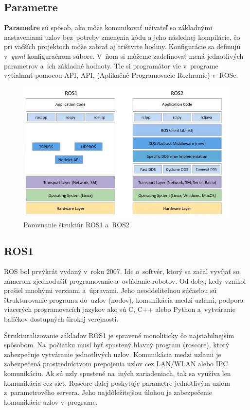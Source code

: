 \subsection{Parametre}
\label{sec:parametre}

\textbf{Parametre} sú spôsob, ako môže komunikovať užívateľ so základnými nastaveniami uzlov bez~potreby zmenenia kódu a jeho
následnej kompilácie, čo pri väčších projektoch môže zabrať aj trištvrte hodiny. Konfigurácie sa definujú v~\textit{yaml} konfiguračnom
súbore. V~ňom si môžeme zadefinovať mená jednotlivých parametrov a~ich základné hodnoty. Tie si programátor vie v~programe
vytiahnuť pomocou API, \acrlong{API}, (Aplikačné Programovacie Rozhranie) v~ROSe.

\begin{figure}[!htbp]
	\centering
	\includegraphics[width=15cm]{img/strukturaRos1Ros2.png}
	\caption{Porovnanie štruktúr ROS1 a~ROS2~\cite{comparison}}
	\label{fig:struktury}
\end{figure}

\subsection{ROS1}

ROS bol prvýkrát vydaný v~roku 2007. Ide o~softvér, ktorý sa začal vyvíjať so zámerom zjednodušiť programovanie a~ovládanie robotov.
Od doby, kedy vznikol prešiel mnohými verziami a~úpravami. Jeho neoddeliteľnou súčasťou sú štrukturovanie programu do~uzlov (nodov),
komunikácia medzi uzlami, podpora viacerých programovacích jazykov ako sú C, C++ alebo Python a~vytváranie balíčkov dostupných širokej
verejnosti.

Štrukturalizovanie základov ROS1 je spravené monoliticky čo najstabilnejším spôsobom. Na~počiatku musí byť spustený hlavný program (roscore),
ktorý zabezpečuje vytváranie jednotlivých uzlov. Komunikácia medzi uzlami je zabezpečená prostredníctvom prepojenia uzlov cez LAN/WLAN
alebo IPC komunikáciu. Ak sú uzly spustené na~iných zariadeniach, tak sa využíva len komunikácia cez sieť. Roscore ďalej poskytuje parametre
jednotlivým uzlom z~parametrového servera. Jeho najdôležitejšou úlohou je zabezpečenie komunikácie uzlov v~programe.

